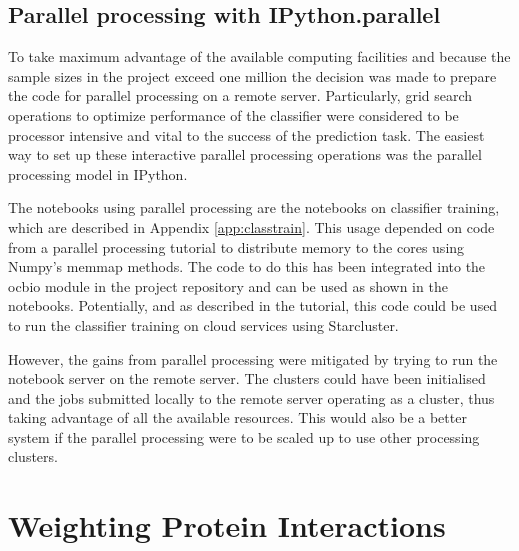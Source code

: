 



\subsection{Parallel processing with IPython.parallel}

To take maximum advantage of the available computing facilities and because the sample sizes in the project exceed one million the decision was made to prepare the code for parallel processing on a remote server.
Particularly, grid search operations to optimize performance of the classifier were considered to be processor intensive and vital to the success of the prediction task.
The easiest way to set up these interactive parallel processing operations was the parallel processing model in IPython\autocite{parallel_python_webpage}.

The notebooks using parallel processing are the notebooks on classifier training, which are described in Appendix \ref{app:classtrain}.
This usage depended on code from a parallel processing tutorial\autocite{ogrisel_parallel} to distribute memory to the cores using Numpy's memmap methods.
The code to do this has been integrated into the ocbio module in the project repository and can be used as shown in the notebooks.
Potentially, and as described in the tutorial, this code could be used to run the classifier training on cloud services using Starcluster.

However, the gains from parallel processing were mitigated by trying to run the notebook server on the remote server.
The clusters could have been initialised and the jobs submitted locally to the remote server operating as a cluster, thus taking advantage of all the available resources.
This would also be a better system if the parallel processing were to be scaled up to use other processing clusters.

\section{Weighting Protein Interactions}

